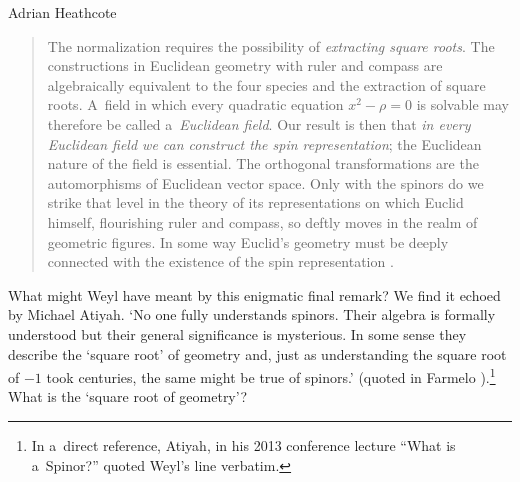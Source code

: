 \begin{artengenv}{Adrian Heathcote}
\begin{quotation}
The normalization requires the possibility of \textit{extracting square roots}. The constructions in Euclidean geometry with ruler and compass are algebraically equivalent to the four species and the extraction of square roots. A~field in which every quadratic equation  $x^{2} - \rho = 0$ is solvable may therefore be called a~\textit{Euclidean field}. Our result is then that \textit{in every Euclidean field we can construct the spin representation}; the Euclidean nature of the field is essential. The orthogonal transformations are the automorphisms of Euclidean vector space. Only with the spinors do we strike that level in the theory of its representations on which Euclid himself, flourishing ruler and compass, so deftly moves in the realm of geometric figures. In some way Euclid's geometry must be deeply connected with the existence of the spin representation \parencite[273]{weyl_classical_1939}.
\end{quotation}
What might Weyl have meant by this enigmatic final remark? We find it echoed by Michael Atiyah. `No one fully understands spinors. Their algebra is formally understood but their general significance is mysterious. In some sense they describe the `square root' of geometry and, just as understanding the square root of $-1$ took centuries, the same might be true of spinors.' (quoted in Farmelo \parencite*{farmelo_strangest_2009}).\footnote{In a~direct reference, Atiyah, in his 2013 conference lecture ``What is a~Spinor?'' quoted Weyl's line verbatim.} What is the `square root of geometry'?


\end{artengenv}
